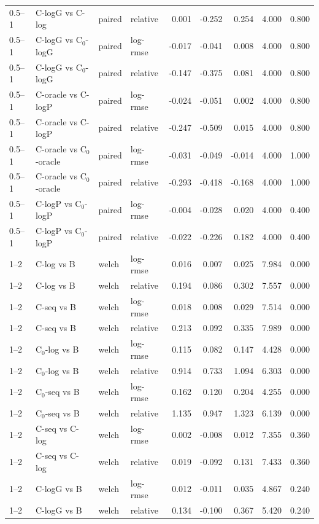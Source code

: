 \begin{longtable}{llllrrrrr}
0.5–1 & C-logG vs C-log & paired & relative & 0.001 & -0.252 & 0.254 & 4.000 & 0.800 \\
0.5–1 & C-logG vs C$_0$-logG & paired & log-rmse & -0.017 & -0.041 & 0.008 & 4.000 & 0.800 \\
0.5–1 & C-logG vs C$_0$-logG & paired & relative & -0.147 & -0.375 & 0.081 & 4.000 & 0.800 \\
0.5–1 & C-oracle vs C-logP & paired & log-rmse & -0.024 & -0.051 & 0.002 & 4.000 & 0.800 \\
0.5–1 & C-oracle vs C-logP & paired & relative & -0.247 & -0.509 & 0.015 & 4.000 & 0.800 \\
0.5–1 & C-oracle vs C$_0$-oracle & paired & log-rmse & -0.031 & -0.049 & -0.014 & 4.000 & 1.000 \\
0.5–1 & C-oracle vs C$_0$-oracle & paired & relative & -0.293 & -0.418 & -0.168 & 4.000 & 1.000 \\
0.5–1 & C-logP vs C$_0$-logP & paired & log-rmse & -0.004 & -0.028 & 0.020 & 4.000 & 0.400 \\
0.5–1 & C-logP vs C$_0$-logP & paired & relative & -0.022 & -0.226 & 0.182 & 4.000 & 0.400 \\
1–2 & C-log vs B & welch & log-rmse & 0.016 & 0.007 & 0.025 & 7.984 & 0.000 \\
1–2 & C-log vs B & welch & relative & 0.194 & 0.086 & 0.302 & 7.557 & 0.000 \\
1–2 & C-seq vs B & welch & log-rmse & 0.018 & 0.008 & 0.029 & 7.514 & 0.000 \\
1–2 & C-seq vs B & welch & relative & 0.213 & 0.092 & 0.335 & 7.989 & 0.000 \\
1–2 & C$_0$-log vs B & welch & log-rmse & 0.115 & 0.082 & 0.147 & 4.428 & 0.000 \\
1–2 & C$_0$-log vs B & welch & relative & 0.914 & 0.733 & 1.094 & 6.303 & 0.000 \\
1–2 & C$_0$-seq vs B & welch & log-rmse & 0.162 & 0.120 & 0.204 & 4.255 & 0.000 \\
1–2 & C$_0$-seq vs B & welch & relative & 1.135 & 0.947 & 1.323 & 6.139 & 0.000 \\
1–2 & C-seq vs C-log & welch & log-rmse & 0.002 & -0.008 & 0.012 & 7.355 & 0.360 \\
1–2 & C-seq vs C-log & welch & relative & 0.019 & -0.092 & 0.131 & 7.433 & 0.360 \\
1–2 & C-logG vs B & welch & log-rmse & 0.012 & -0.011 & 0.035 & 4.867 & 0.240 \\
1–2 & C-logG vs B & welch & relative & 0.134 & -0.100 & 0.367 & 5.420 & 0.240 \\

\end{longtable}
